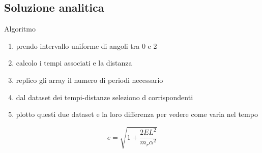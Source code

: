     \subsection[Analitic]{Soluzione analitica}
        \begin{frame}{Algoritmo}
            \begin{block}
                \begin{enumerate}
                    \item prendo intervallo uniforme di angoli tra 0 e 2
                    \item calcolo i tempi associati e la distanza
                    \item replico gli array il numero di periodi necessario
                    \item dal dataset dei tempi-distanze seleziono d corrispondenti
                    \item plotto questi due dataset e la loro differenza per vedere come varia nel tempo
                \end{enumerate}
            \end{block}
            \begin{equation}
                e = \sqrt{1+\frac{2EL^2}{m_r\alpha^2}}
            \end{equation}
        \end{frame}